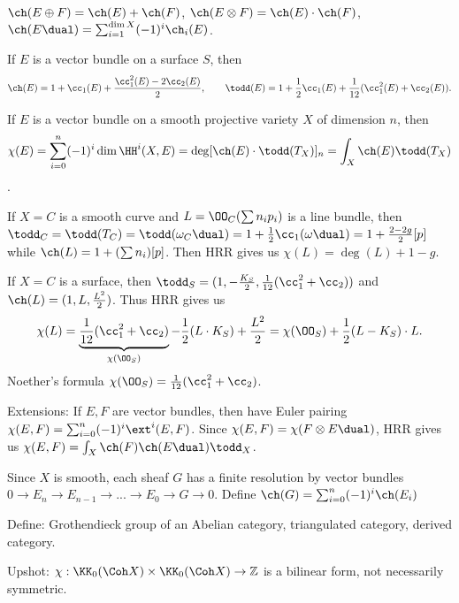 \begin{exercise}
\(\ch(E\oplus F)=\ch(E)+\ch(F)\), \(\ch(E\otimes F)=\ch(E)\cdot \ch(F)\),
\(\ch(E\dual)=\sum_{i=1}^{\dim X}(-1)^i\ch_i(E)\).
\end{exercise}

\begin{exercise}
If \(E\) is a vector bundle on a surface \(S\), then
\[
\ch(E)=1+\cc_1(E)+\frac{\cc_1^2(E)-2\cc_2(E)}{2}, \qquad
\todd(E) = 1+\frac{1}{2} \cc_1(E) + \frac{1}{12} (\cc_1^2(E)+\cc_2(E)).
\]
\end{exercise}

\begin{theorem}
If \(E\) is a vector bundle on a smooth projective variety \(X\) of dimension
\(n\), then
\[\chi(E) = \sum_{i=0}^n (-1)^i \dim \HH^i(X,E) = \deg[\ch(E)\cdot \todd(T_X)]_n
= \int_X \ch(E)\todd(T_X)\].
\end{theorem}

\begin{example}
If \(X=C\) is a smooth curve and \(L=\OO_C(\sum n_i p_i)\) is a line bundle,
then \(\todd_C=\todd(T_C)=\todd(\omega_C\dual) = 1+\frac{1}{2}\cc_1(\omega\dual)
= 1+\frac{2-2g}{2}[p]\) while \(\ch(L) =1+(\sum n_i)[p]\). Then HRR gives us
\(\chi(L) = \deg(L)+1-g\).
\end{example}

\begin{example}
If \(X=C\) is a surface, then \(\todd_S=(1,-\frac{K_S}{2},
\frac{1}{12}(\cc_1^2+\cc_2))\) and \(\ch(L)=(1,L,\frac{L^2}{2})\). Thus HRR gives
us
\[\chi(L)=\underbrace{\frac{1}{12}(\cc_1^2+\cc_2)}_{\chi(\OO_S)} -
\frac{1}{2}(L\cdot K_S) + \frac{L^2}{2} = \chi(\OO_S)+\frac{1}{2}(L-K_S)\cdot L.\]
Noether's formula \(\chi(\OO_S)=\frac{1}{12}(\cc_1^2+\cc_2)\).
\end{example}

Extensions: If \(E,F\) are vector bundles, then have Euler pairing
\(\chi(E,F)=\sum_{i=0}^n (-1)^i \ext^i (E,F)\). Since \(\chi(E,F)=\chi(F\otimes
E\dual)\), HRR gives us \(\chi(E,F)=\int_X \ch(F)\ch(E\dual)\todd_X\).


Since \(X\) is smooth, each sheaf \(G\) has a finite resolution by vector
bundles \(0\to E_n\to E_{n-1}\to...\to E_0\to G\to 0\).  Define
\(\ch(G)=\sum_{i=0}^n(-1)^i \ch(E_i)\)

Define: Grothendieck group of an Abelian category, triangulated category,
derived category.

Upshot: \(\chi:\KK_0(\Coh X)\times \KK_0(\Coh X)\to \mathbb{Z}\) is a bilinear
form, not necessarily symmetric.


